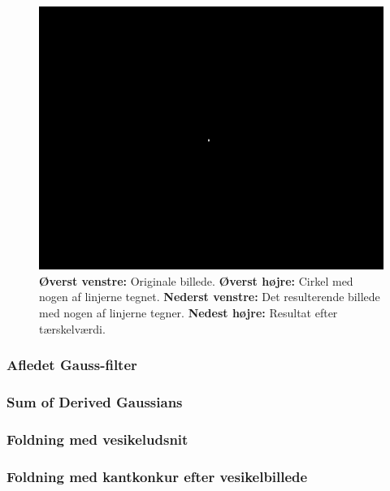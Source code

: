 \begin{figure}[H]
\begin{minipage}[b]{0.5\linewidth}
	\end{minipage}
	\hspace{0.5cm}
	\begin{minipage}[b]{0.5\linewidth}
		\centering
		\includegraphics[scale=1.5]{files/premethod/img/dirmap4.png}
	\end{minipage}
	\caption{\textbf{Øverst venstre:} Originale billede. \textbf{Øverst højre:} Cirkel med nogen af linjerne tegnet. \textbf{Nederst venstre:} Det resulterende billede med nogen af linjerne tegner. \textbf{Nedest højre:} Resultat efter tærskelværdi.\label{fig:premethod_houghres}}
\end{figure}


\subsubsection{Afledet Gauss-filter}

\subsubsection{Sum of Derived Gaussians}

\subsubsection{Foldning med vesikeludsnit}


\subsubsection{Foldning med kantkonkur efter vesikelbillede}


